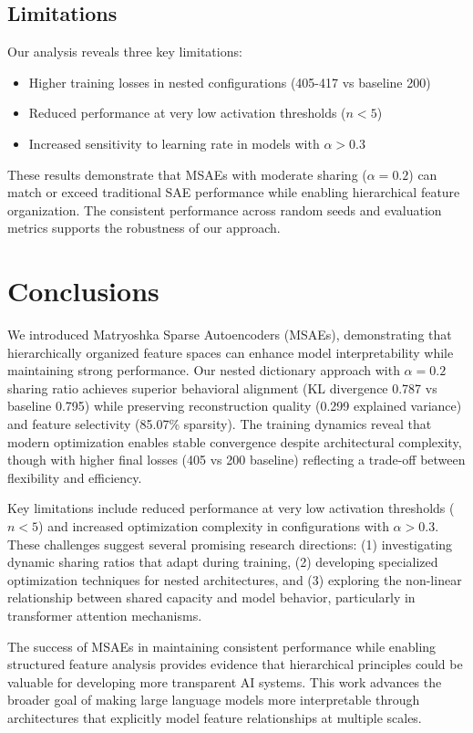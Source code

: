 \documentclass{article} %
\begin{document}
\subsection{Limitations}

Our analysis reveals three key limitations:

\begin{itemize}
    \item Higher training losses in nested configurations (405-417 vs baseline 200)
    \item Reduced performance at very low activation thresholds ($n<5$)
    \item Increased sensitivity to learning rate in models with $\alpha > 0.3$
\end{itemize}

These results demonstrate that MSAEs with moderate sharing ($\alpha=0.2$) can match or exceed traditional SAE performance while enabling hierarchical feature organization. The consistent performance across random seeds and evaluation metrics supports the robustness of our approach.

\section{Conclusions}
\label{sec:conclusion}

We introduced Matryoshka Sparse Autoencoders (MSAEs), demonstrating that hierarchically organized feature spaces can enhance model interpretability while maintaining strong performance. Our nested dictionary approach with $\alpha=0.2$ sharing ratio achieves superior behavioral alignment (KL divergence 0.787 vs baseline 0.795) while preserving reconstruction quality (0.299 explained variance) and feature selectivity (85.07\% sparsity). The training dynamics reveal that modern optimization enables stable convergence despite architectural complexity, though with higher final losses (405 vs 200 baseline) reflecting a trade-off between flexibility and efficiency.

Key limitations include reduced performance at very low activation thresholds ($n<5$) and increased optimization complexity in configurations with $\alpha>0.3$. These challenges suggest several promising research directions: (1) investigating dynamic sharing ratios that adapt during training, (2) developing specialized optimization techniques for nested architectures, and (3) exploring the non-linear relationship between shared capacity and model behavior, particularly in transformer attention mechanisms.

The success of MSAEs in maintaining consistent performance while enabling structured feature analysis provides evidence that hierarchical principles could be valuable for developing more transparent AI systems. This work advances the broader goal of making large language models more interpretable through architectures that explicitly model feature relationships at multiple scales.



\end{document}
